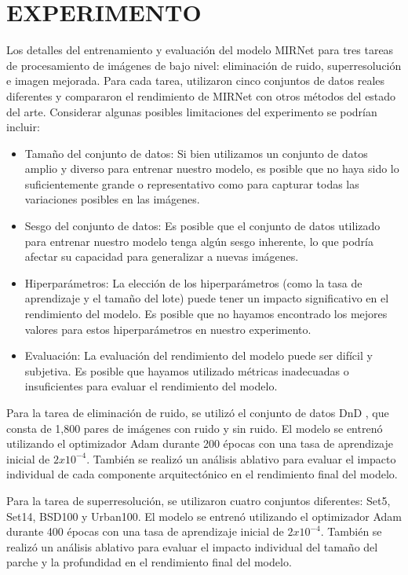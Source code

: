 \documentclass[a4paper,
               ]{jacow}
\begin{document}
\section{EXPERIMENTO}

Los detalles del entrenamiento y evaluación del modelo MIRNet para tres tareas de procesamiento de imágenes de bajo nivel: eliminación de ruido, superresolución e imagen mejorada. Para cada tarea, utilizaron cinco conjuntos de datos reales diferentes y compararon el rendimiento de MIRNet con otros métodos del estado del arte. Considerar algunas posibles limitaciones del experimento se podrían incluir:

\begin{itemize}
  \item Tamaño del conjunto de datos: Si bien utilizamos un conjunto de datos amplio y diverso para entrenar nuestro modelo, es posible que no haya sido lo suficientemente grande o representativo como para capturar todas las variaciones posibles en las imágenes.
  \item Sesgo del conjunto de datos: Es posible que el conjunto de datos utilizado para entrenar nuestro modelo tenga algún sesgo inherente, lo que podría afectar su capacidad para generalizar a nuevas imágenes.
  \item Hiperparámetros: La elección de los hiperparámetros (como la tasa de aprendizaje y el tamaño del lote) puede tener un impacto significativo en el rendimiento del modelo. Es posible que no hayamos encontrado los mejores valores para estos hiperparámetros en nuestro experimento.
  \item Evaluación: La evaluación del rendimiento del modelo puede ser difícil y subjetiva. Es posible que hayamos utilizado métricas inadecuadas o insuficientes para evaluar el rendimiento del modelo.
\end{itemize}

Para la tarea de eliminación de ruido, se utilizó el conjunto de datos DnD \cite{dnd}, que consta de 1,800 pares de imágenes con ruido y sin ruido. El modelo se entrenó utilizando el optimizador Adam durante 200 épocas con una tasa de aprendizaje inicial de $2x10^{-4}$. También se realizó un análisis ablativo para evaluar el impacto individual de cada componente arquitectónico en el rendimiento final del modelo.

Para la tarea de superresolución, se utilizaron cuatro conjuntos diferentes: Set5, Set14, BSD100 y Urban100. El modelo se entrenó utilizando el optimizador Adam durante 400 épocas con una tasa de aprendizaje inicial de $2x10^{-4}$. También se realizó un análisis ablativo para evaluar el impacto individual del tamaño del parche y la profundidad en el rendimiento final del modelo.
\end{document}
